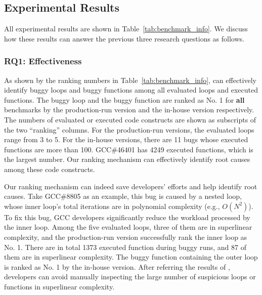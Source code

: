 \subsection{Experimental Results}
\label{sec:results}

All experimental results are shown in Table~\ref{tab:benchmark_info}.
We discuss how these results can answer 
the previous three research questions as follows.

\subsubsection{RQ1: Effectiveness}
As shown by the ranking numbers in Table~\ref{tab:benchmark_info},
\Tool can effectively identify buggy loops and buggy functions 
among all evaluated loops and executed functions.
The buggy loop and the buggy function are ranked as No. 1 for \textbf{all}
benchmarks by the production-run version and the in-house version respectively. 
The numbers of evaluated or executed code constructs are shown as subscripts of 
the two ``ranking'' columns. 
For the production-run versions, the evaluated loops range from 3 to 5.
For the in-house versions, there are 11 bugs whose executed functions are more than 
100.  GCC\#46401 has 4249 executed functions, 
which is the largest number.  
Our ranking mechanism can effectively identify
root causes among these code constructs.


Our ranking mechanism can indeed save developers' efforts 
and help identify root causes. 
Take GCC\#8805 as an example,
this bug is caused by a nested loop, 
whose inner loop's total iterations are in polynomial complexity (e.g., $O(N^2)$).
To fix this bug, GCC developers significantly reduce 
the workload processed by the inner loop. 
Among the five evaluated loops, three of them are in superlinear complexity, 
and the production-run version successfully rank the inner loop as No. 1.
There are in total 1373 executed function during buggy runs,
and 87 of them are in superlinear complexity. 
The buggy function containing the outer loop is ranked as No. 1 
by the in-house version. 
After referring the results of \Tool, 
developers can avoid manually inspecting the large number of  
suspicious loops or functions in superlinear complexity. 

